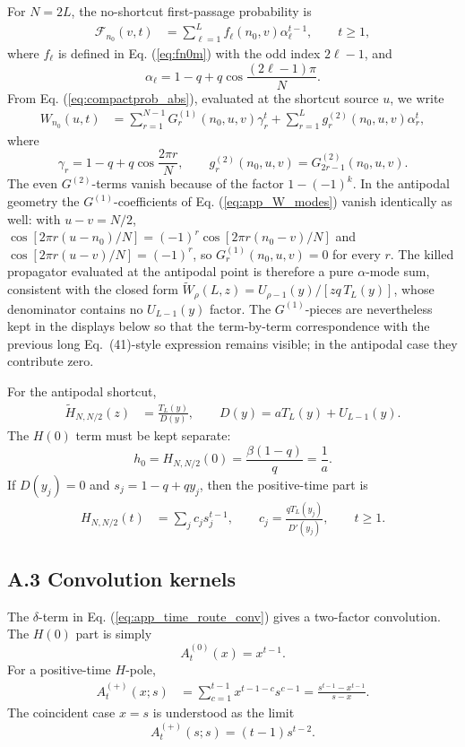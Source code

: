 \documentclass[superscriptaddress, amsmath, amssymb, aps, pre, floatfix]{revtex4-2}
\begin{document}
For \(N=2L\), the no-shortcut first-passage probability is
\begin{align}
\mathcal F_{n_0}(v,t)
&=\sum_{\ell=1}^{L}f_\ell(n_0,v)\alpha_\ell^{t-1},\qquad t\geq1,
\label{eq:app_F0_modes}
\end{align}
where \(f_\ell\) is defined in Eq. (\ref{eq:fn0m}) with the odd index \(2\ell-1\), and
\[
  \alpha_\ell=1-q+q\cos\frac{(2\ell-1)\pi}{N}.
\]
From Eq. (\ref{eq:compactprob_abs}), evaluated at the shortcut source \(u\), we write
\begin{align}
W_{n_0}(u,t)
&=\sum_{r=1}^{N-1}G^{(1)}_r(n_0,u,v)\gamma_r^t
+\sum_{r=1}^{L}g^{(2)}_r(n_0,u,v)\alpha_r^t,
\label{eq:app_W_modes}
\end{align}
where
\[
  \gamma_r=1-q+q\cos\frac{2\pi r}{N},
  \qquad
  g^{(2)}_r(n_0,u,v)=G^{(2)}_{2r-1}(n_0,u,v).
\]
The even \(G^{(2)}\)-terms vanish because of the factor \(1-(-1)^k\).
In the antipodal geometry the \(G^{(1)}\)-coefficients of Eq. (\ref{eq:app_W_modes}) vanish identically as well: with \(u-v=N/2\),
\(\cos[2\pi r(u-n_0)/N]=(-1)^r\cos[2\pi r(n_0-v)/N]\) and \(\cos[2\pi r(u-v)/N]=(-1)^r\), so \(G^{(1)}_r(n_0,u,v)=0\) for every \(r\).  The killed propagator evaluated at the antipodal point is therefore a pure \(\alpha\)-mode sum, consistent with the closed form \(\widetilde W_\rho(L,z)=U_{\rho-1}(y)/[zq\,T_L(y)]\), whose denominator contains no \(U_{L-1}(y)\) factor.  The \(G^{(1)}\)-pieces are nevertheless kept in the displays below so that the term-by-term correspondence with the previous long Eq.~(41)-style expression remains visible; in the antipodal case they contribute zero.

For the antipodal shortcut,
\begin{align}
\widetilde H_{N,N/2}(z)
&=\frac{T_L(y)}{D(y)},\qquad
D(y)=aT_L(y)+U_{L-1}(y).
\label{eq:app_H_D}
\end{align}
The \(H(0)\) term must be kept separate:
\[
  h_0=H_{N,N/2}(0)=\frac{\beta(1-q)}{q}=\frac{1}{a}.
\]
If \(D(y_j)=0\) and \(s_j=1-q+qy_j\), then the positive-time part is
\begin{align}
H_{N,N/2}(t)
&=\sum_j c_j s_j^{t-1},\qquad
c_j=\frac{qT_L(y_j)}{D'(y_j)},\qquad t\geq1.
\label{eq:app_H_residue}
\end{align}

\subsection*{A.3 Convolution kernels}

The \(\delta\)-term in Eq. (\ref{eq:app_time_route_conv}) gives a two-factor convolution.  The \(H(0)\) part is simply
\[
  A^{(0)}_t(x)=x^{t-1}.
\]
For a positive-time \(H\)-pole,
\begin{align}
A^{(+)}_t(x;s)
&=\sum_{c=1}^{t-1}x^{t-1-c}s^{c-1}
=\frac{s^{t-1}-x^{t-1}}{s-x}.
\label{eq:app_A_plus}
\end{align}
The coincident case \(x=s\) is understood as the limit
\[
  A^{(+)}_t(s;s)=(t-1)s^{t-2}.
\]
\end{document}
